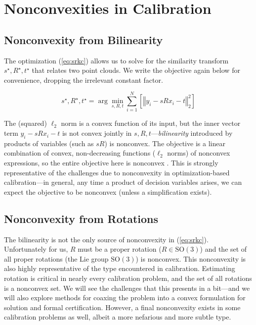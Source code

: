 \documentclass[conference]{IEEEtran}
\begin{document}
\section{Nonconvexities in Calibration}

\subsection{Nonconvexity from Bilinearity}

The optimization (\ref{eq:srkc}) allows us to solve for the similarity transform \( s^\star, R^\star, t^\star \) that relates two point clouds.  We write the objective again below for convenience, dropping the irrelevant constant factor.

\begin{equation}
	s^\star, R^\star, t^\star = \arg\min_{s, R, t} \sum_{i=1}^N \left[\left\Vert y_i - s R x_i - t \right\Vert_2^2 \right]
\end{equation}

The (squared) \( \ell_2 \) norm is a convex function of its input, but the inner vector term \( y_i - s R x_i - t \) is not convex jointly in \( s, R, t \)---\textit{bilinearity} introduced by products of variables (such as \( s R \)) is nonconvex.  The objective is a linear combination of convex, non-decreasing functions (\( \ell_2 \) norms) of nonconvex expressions, so the entire objective here is nonconvex \cite{dcp}.  This is strongly representative of the challenges due to nonconvexity in optimization-based calibration---in general, any time a product of decision variables arises, we can expect the objective to be nonconvex (unless a simplification exists).

\subsection{Nonconvexity from Rotations}

The bilinearity is not the only source of nonconvexity in (\ref{eq:srkc}).  Unfortunately for us, \( R \) must be a proper rotation (\( R \in \mathrm{SO(3)} \)) and the set of all proper rotations (the Lie group \( \mathrm{SO(3)} \)) is nonconvex.  This nonconvexity is also highly representative of the type encountered in calibration.  Estimating rotation is critical in nearly every calibration problem, and the set of all rotations is a nonconvex set.  We will see the challenges that this presents in a bit---and we will also explore methods for coaxing the problem into a convex formulation for solution and formal certification.  However, a final nonconvexity exists in some calibration problems as well, albeit a more nefarious and more subtle type.
\end{document}
